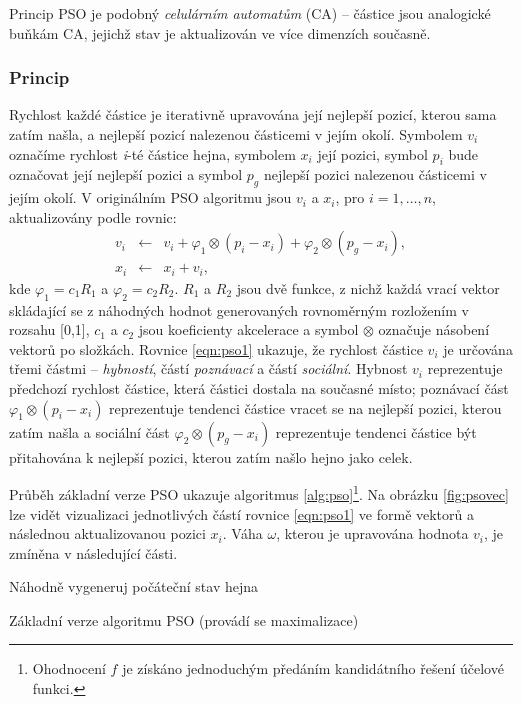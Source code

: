 \documentclass[a4paper,12pt]{article}
\begin{document}
Princip PSO je podobný {\it celulárním automatům} (CA) -- částice jsou analogické buňkám CA, jejichž stav je
aktualizován ve více dimenzích současně.

\subsubsection{Princip}
Rychlost každé částice je iterativně upravována její nejlepší pozicí, kterou sama zatím našla, a nejlepší
pozicí nalezenou částicemi v jejím okolí. Symbolem $v_i$ označíme rychlost {\it i}-té částice hejna, symbolem
$x_i$ její pozici, symbol $p_i$ bude označovat její nejlepší pozici a symbol $p_g$ nejlepší pozici nalezenou
částicemi v jejím okolí. V originálním PSO algoritmu jsou $v_i$ a $x_i$, pro $i=1,\dots,n$, aktualizovány
podle rovnic:
\begin{eqnarray}
v_i & \leftarrow & v_i+\varphi_1\otimes(p_i-x_i)+\varphi_2\otimes(p_g-x_i), \label{eqn:pso1} \\
x_i & \leftarrow & x_i + v_i, \label{eqn:pso2}
\end{eqnarray}
kde $\varphi_1=c_1R_1$ a $\varphi_2=c_2R_2$. $R_1$ a $R_2$ jsou dvě funkce, z nichž každá vrací vektor skládající
se z náhodných hodnot generovaných rovnoměrným rozložením v rozsahu [0,1], $c_1$ a $c_2$ jsou koeficienty
akcelerace a symbol $\otimes$ označuje násobení vektorů po složkách. Rovnice \ref{eqn:pso1} ukazuje, že rychlost
částice $v_i$ je určována třemi částmi -- {\it hybností}, částí {\it poznávací} a částí {\it sociální}. Hybnost $v_i$
reprezentuje předchozí rychlost částice, která částici dostala na současné místo; poznávací část
$\varphi_1\otimes(p_i-x_i)$ reprezentuje tendenci částice vracet se na nejlepší pozici, kterou zatím našla a
sociální část $\varphi_2\otimes(p_g-x_i)$ reprezentuje tendenci částice být přitahována k nejlepší pozici, kterou zatím našlo hejno jako celek.

Průběh základní verze PSO ukazuje algoritmus \ref{alg:pso}\footnote{Ohodnocení $f$ je získáno jednoduchým předáním
kandidátního řešení účelové funkci.}.
Na obrázku \ref{fig:psovec} lze vidět vizualizaci jednotlivých částí rovnice \ref{eqn:pso1} ve formě
vektorů a následnou aktualizovanou pozici $x_i$. Váha $\omega$, kterou je upravována hodnota $v_i$, je
zmíněna v následující části.

\begin{algorithm}[here]
  \DontPrintSemicolon
  \SetAlgoNoLine
  Náhodně vygeneruj počáteční stav hejna\;
\caption{Základní verze algoritmu PSO (provádí se maximalizace)\label{alg:pso}}
\end{algorithm}
\end{document}
